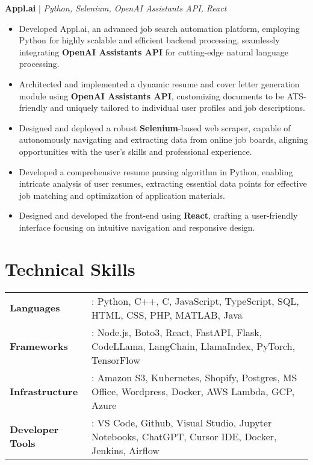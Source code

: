 \textbf{Appl.ai} | \textit{Python, Selenium, OpenAI Assistants API, React}
\begin{itemize}
    \item Developed Appl.ai, an advanced job search automation platform, employing Python for highly scalable and efficient backend processing, seamlessly integrating \textbf{OpenAI Assistants API} for cutting-edge natural language processing.
    \item Architected and implemented a dynamic resume and cover letter generation module using \textbf{OpenAI Assistants API}, customizing documents to be ATS-friendly and uniquely tailored to individual user profiles and job descriptions.
    \item Designed and deployed a robust \textbf{Selenium}-based web scraper, capable of autonomously navigating and extracting data from online job boards, aligning opportunities with the user's skills and professional experience.
    \item Developed a comprehensive resume parsing algorithm in Python, enabling intricate analysis of user resumes, extracting essential data points for effective job matching and optimization of application materials.
    \item Designed and developed the front-end using \textbf{React}, crafting a user-friendly interface focusing on intuitive navigation and responsive design.
\end{itemize}

\section*{Technical Skills}

\begin{tabular}{ll}
\textbf{Languages} &: Python, C++, C, JavaScript, TypeScript, SQL, HTML, CSS, PHP, MATLAB, Java \\
\textbf{Frameworks} &: Node.js, Boto3, React, FastAPI, Flask, CodeLLama, LangChain, LlamaIndex, PyTorch, TensorFlow \\
\textbf{Infrastructure} &: Amazon S3, Kubernetes, Shopify, Postgres, MS Office, Wordpress, Docker, AWS Lambda, GCP, Azure \\
\textbf{Developer Tools} &: VS Code, Github, Visual Studio, Jupyter Notebooks, ChatGPT, Cursor IDE, Docker, Jenkins, Airflow \\
\end{tabular}

